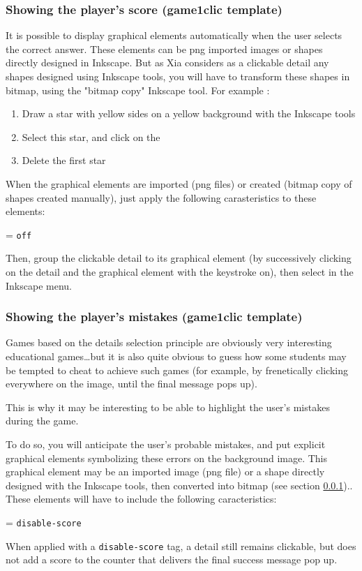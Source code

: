 \subsubsection{Showing the player's score (game1clic template)}\label{playersscore}

It is possible to display graphical elements automatically  when the user 
selects the correct answer. These elements can be png imported images or shapes directly designed in
Inkscape.
But as Xia considers as a clickable 
detail any shapes designed using Inkscape tools, you 
will have to transform these shapes in bitmap, using the "bitmap copy" Inkscape tool. 
For example :
\begin{enumerate}
 \item Draw  a star with yellow sides on a yellow background with the Inkscape tools 
 \item Select this star, and click on the 
 \item Delete the first star
\end{enumerate}

When the graphical elements are imported (png files) or created (bitmap copy 
of shapes created manually), just apply the following 
carasteristics to these elements:
\begin{center}
 = \verb|off|
\end{center}
Then, group the clickable detail to its graphical element (by successively 
clicking on the detail and the graphical element with the \Shift keystroke on),
then select  in the Inkscape  menu.

\subsubsection{Showing the player's mistakes (game1clic template)}

Games based on the details selection principle are obviously very
interesting educational games\ldots but it is also quite obvious to guess how some 
students may be tempted to cheat to achieve such games (for example, by 
frenetically clicking everywhere on the image, until the final message pops up).

This is why it may be interesting to be able to 
highlight the user's mistakes during the game.

To do so, you will anticipate the user's probable mistakes, and 
put explicit graphical elements symbolizing these errors on the background image. 
This graphical element may be an imported image 
(png file) or a shape directly designed with the Inkscape tools, 
then converted into bitmap (see section \ref{playersscore}).. These elements will have to include the following caracteristics:
\begin{center}
 = \verb|disable-score| 
\end{center}
When applied with a \verb|disable-score| tag, a detail still remains clickable, but does not 
add a score to the counter that delivers the final success message pop up.


